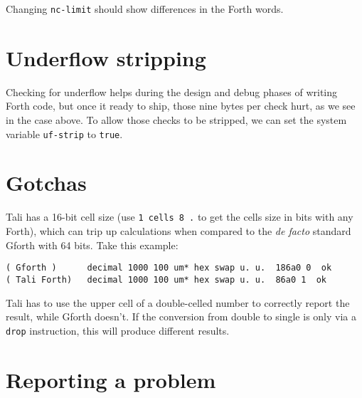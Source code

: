 \noindent Changing \texttt{nc-limit} should show differences in the Forth words.



\section{Underflow stripping}

Checking for underflow helps during the design and debug phases of writing Forth
code, but once it ready to ship, those nine bytes per check hurt, as we see in
the case above. To allow those checks to be stripped, we can set the system
variable \texttt{uf-strip} to \texttt{true}.





\section{Gotchas}

Tali has a 16-bit cell size (use \texttt{1 cells 8 \* .} to get the cells size in
bits with any Forth), which can trip up calculations when compared to the
\textit{de facto} standard Gforth with 64 bits. Take this example:

\begin{lstlisting}[frame=lines]
( Gforth )      decimal 1000 100 um* hex swap u. u.  186a0 0  ok
( Tali Forth)   decimal 1000 100 um* hex swap u. u.  86a0 1  ok
\end{lstlisting}

\noindent Tali has to use the upper cell of a double-celled
number to correctly report the result, while Gforth doesn't. If the conversion
from double to single is only via a \texttt{drop} instruction, this will produce
different results.



\section{Reporting a problem}





